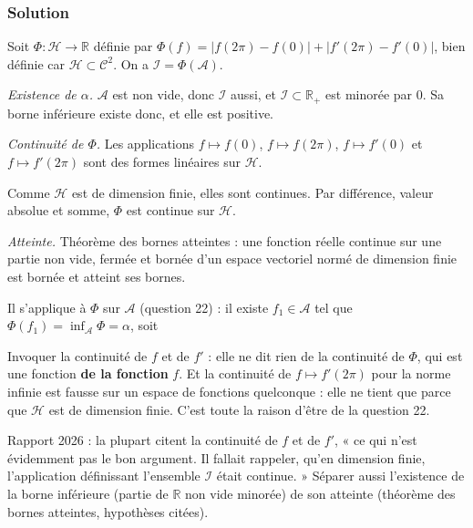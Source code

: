 \documentclass[11pt,a4paper]{article}
\newcommand{\equationajustee}[1]{%
  \sbox{\boiteequation}{$\displaystyle #1$}%
  \ifdim\wd\boiteequation>\linewidth
    \[\resizebox{\linewidth}{!}{\usebox{\boiteequation}}\]%
  \else
    \[#1\]%
  \fi}
\begin{document}
\hypertarget{solution-22}{%
\subsubsection{Solution}\label{solution-22}}

Soit \(\Phi:\mathcal H\to\mathbb R\) définie par \(\Phi(f)=|f(2\pi)-f(0)|+|f'(2\pi)-f'(0)|\), bien définie car \(\mathcal H\subset\mathcal C^2\). On a \(\mathcal I=\Phi(\mathcal A)\).

\emph{Existence de \(\alpha\).} \(\mathcal A\) est non vide, donc \(\mathcal I\) aussi, et \(\mathcal I\subset\mathbb R_+\) est minorée par \(0\). Sa borne inférieure existe donc, et elle est positive.

\emph{Continuité de \(\Phi\).} Les applications \(f\mapsto f(0)\), \(f\mapsto f(2\pi)\), \(f\mapsto f'(0)\) et \(f\mapsto f'(2\pi)\) sont des formes linéaires sur \(\mathcal H\).

Comme \(\mathcal H\) est de dimension finie, elles sont continues. Par différence, valeur absolue et somme, \(\Phi\) est continue sur \(\mathcal H\).

\emph{Atteinte.} Théorème des bornes atteintes : une fonction réelle continue sur une partie non vide, fermée et bornée d'un espace vectoriel normé de dimension finie est bornée et atteint ses bornes.

Il s'applique à \(\Phi\) sur \(\mathcal A\) (question 22) : il existe \(f_1\in\mathcal A\) tel que \(\Phi(f_1)=\inf_{\mathcal A}\Phi=\alpha\), soit
\equationajustee{\boxed{\alpha=|f_1(2\pi)-f_1(0)|+|f_1'(2\pi)-f_1'(0)|,\ f_1\in\mathcal A.}}

\begin{piege}

Invoquer la continuité de \(f\) et de \(f'\) : elle ne dit rien de la continuité de \(\Phi\), qui est une fonction \textbf{de la fonction} \(f\). Et la continuité de \(f\mapsto f'(2\pi)\) pour la norme infinie est fausse sur un espace de fonctions quelconque : elle ne tient que parce que \(\mathcal H\) est de dimension finie. C'est toute la raison d'être de la question 22.

\end{piege}

\begin{jury}

Rapport 2026 : la plupart citent la continuité de \(f\) et de \(f'\), « ce qui n'est évidemment pas le bon argument. Il fallait rappeler, qu'en dimension finie, l'application définissant l'ensemble \(\mathcal I\) était continue. » Séparer aussi l'existence de la borne inférieure (partie de \(\mathbb R\) non vide minorée) de son atteinte (théorème des bornes atteintes, hypothèses citées).

\end{jury}
\end{document}
